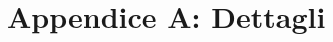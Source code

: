 \documentclass[laurea,oneside,11pt]{USiena_tesiLM}
\begin{document}
\backmatter

\appendix
\chapter{Appendice A: Dettagli}
%


%

\cite{sandou2005predictive}

%
%

\end{document}
